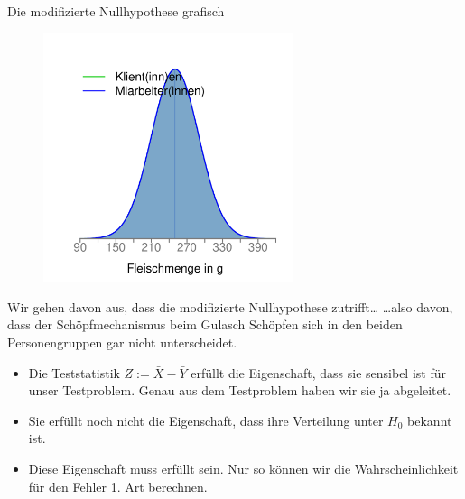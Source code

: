 \documentclass[usenames,dvipsnames,handout]{beamer}
\begin{document}
\begin{frame}{Die modifizierte Nullhypothese grafisch}
\begin{figure}[ht]
 	\centering
 	      \includegraphics[width=0.65\textwidth]{nullhyp.pdf}
 	\end{figure}
\end{frame}

\begin{frame}{Wir gehen davon aus, dass die modifizierte Nullhypothese zutrifft\dots}
\dots also davon, dass der Schöpfmechanismus beim Gulasch Schöpfen sich in den beiden Personengruppen gar nicht unterscheidet.
\begin{itemize}
\item{Die Teststatistik $Z:=\bar{X}-\bar{Y}$ erfüllt die Eigenschaft, dass sie sensibel ist für unser Testproblem. Genau aus dem 
Testproblem haben wir sie ja abgeleitet.}\pause
\item{Sie erfüllt noch nicht die Eigenschaft, dass ihre Verteilung unter $H_{0}$ bekannt ist.}\pause
\item{Diese Eigenschaft muss erfüllt sein. Nur so können wir die Wahrscheinlichkeit für den Fehler 1. Art berechnen.}
\end{itemize}
\end{frame}
\end{document}
